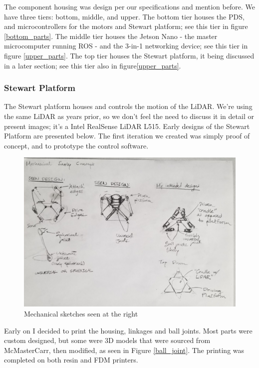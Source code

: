 \documentclass[a4paper, 10pt]{article}
\begin{document}
		The component housing was design per our specifications and mention before. We have three tiers: bottom, middle, and upper. The bottom tier houses the PDS, and microcontrollers for the motors and Stewart platform; see this tier in figure \ref{bottom_parts}. The middle tier houses the Jetson Nano - the master microcomputer running ROS - and the 3-in-1 networking device; see this tier in figure \ref{upper_parts}. The top tier houses the Stewart platform, it being discussed in a later section; see this tier also in figure\ref{upper_parts}.
		
 		\subsubsection*{Stewart Platform}
 		The Stewart platform houses and controls the motion of the LiDAR. We're using the same LiDAR as years prior, so we don't feel the need to discuss it in detail or present images; it's a Intel RealSense LiDAR L515. Early designs of the Stewart Platform are presented below. The first iteration we created was simply proof of concept, and to prototype the control software.
 		
 		\begin{figure} [h]
			\centering
			\includegraphics[scale=0.2]{Photos/early_mechanical}
			\caption{Mechanical sketches seen at the right}
			\label{basic_mechanical}
		\end{figure}
		
		Early on I decided to print the housing, linkages and ball joints. Most parts were custom designed, but some were 3D models that were sourced from McMasterCarr, then modified, as seen in Figure \ref{ball_joint}. The printing was completed on both resin and FDM printers.
		
\end{document}
